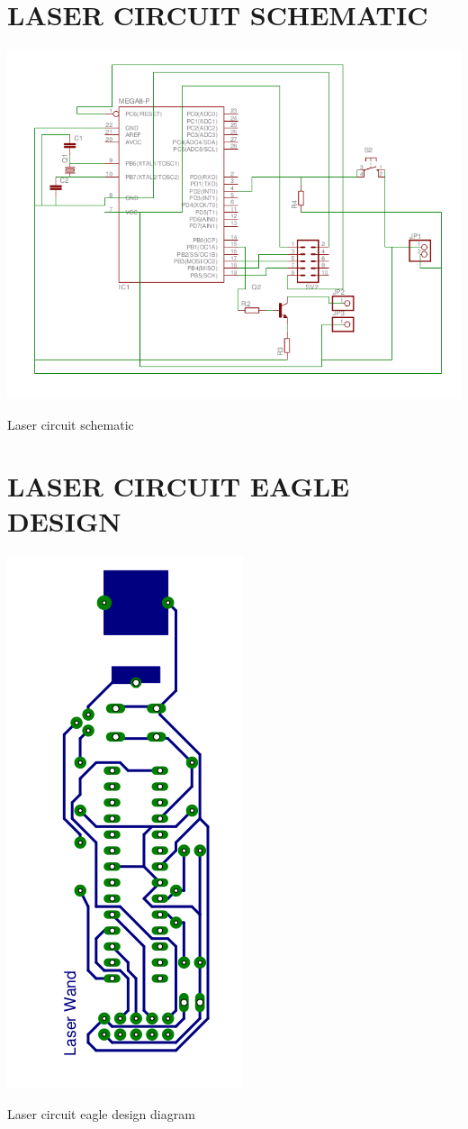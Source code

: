 \documentclass[12pt, a4paper]{article}
\begin{document}
\begin{appendices}
\section{LASER CIRCUIT SCHEMATIC}
\begin{appendixfig}
	\centering
	\includegraphics[scale=0.60]{schematic.png}
	\caption{Laser circuit schematic}
	\label{}
\end{appendixfig}
\newpage
\section{LASER CIRCUIT EAGLE DESIGN}
\begin{appendixfig}
	\centering
	\includegraphics[scale=0.65]{eagle-non-mirror.png}
	\caption{Laser circuit eagle design diagram}
	\label{}
\end{appendixfig}
\newpage

\end{appendices}
\end{document}
